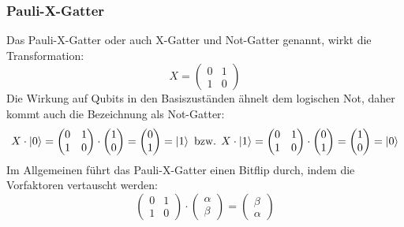 \subsubsection*{Pauli-X-Gatter}
Das Pauli-X-Gatter oder auch X-Gatter und Not-Gatter genannt, 
wirkt die Transformation: 
\[
  X = 
  \begin{pmatrix}
    0 & 1 \\
    1 & 0
    \end{pmatrix}
  \]
Die Wirkung auf Qubits in den Basiszuständen ähnelt dem logischen Not, 
daher kommt auch die Bezeichnung als Not-Gatter:
\[
  X \cdot
  \ket{0} 
  =
  \begin{pmatrix}
    0 & 1 \\
    1 & 0
    \end{pmatrix}
    \cdot
    \begin{pmatrix}
      1 \\
      0
    \end{pmatrix}
    = 
    \begin{pmatrix}
      0 \\
      1
    \end{pmatrix}
    = 
    \ket{1}~
    \text{bzw. }
    X \cdot
  \ket{1} 
  =
  \begin{pmatrix}
    0 & 1 \\
    1 & 0
    \end{pmatrix}
    \cdot
    \begin{pmatrix}
      0 \\
      1
    \end{pmatrix}
    = 
    \begin{pmatrix}
      1 \\
      0
    \end{pmatrix}
    = 
    \ket{0}
  \]
Im Allgemeinen führt das Pauli-X-Gatter einen Bitflip durch, 
indem die Vorfaktoren vertauscht werden:
\[
  \begin{pmatrix}
    0 & 1 \\
    1 & 0
    \end{pmatrix}
    \cdot
    \begin{pmatrix}
      \alpha \\
      \beta
    \end{pmatrix}
    =
    \begin{pmatrix}
      \beta \\
      \alpha
    \end{pmatrix}
  \]

  \vspace{1em}

